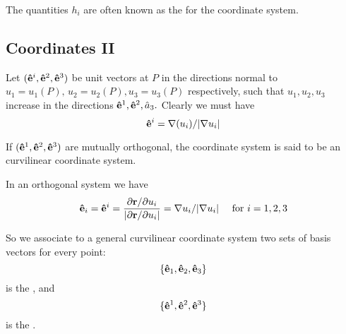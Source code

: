 The quantities 
$h_i$ are often known as the  for the coordinate system.\\

% 
% 


\subsection*{Coordinates II}


Let $(\mathbf{\hat e}^i,\mathbf{\hat e}^2,\mathbf{\hat e}^3)$ be unit vectors at $P$ in the directions normal to 
$u_1 = u_1(P),\,u_2 = u_2(P),u_3 = u_3(P)$
 respectively, such that $u_1, u_2, u_3$ increase in the directions $\mathbf{\hat e}^1, \mathbf{\hat e}^2,\hat  a_3.$ Clearly we must have
 \[
  \mathbf{\hat e}^i = \nabla(u_i)/|\nabla u_i|
\]

\begin{df}
 If $(\mathbf{\hat e}^1, \mathbf{\hat e}^2,\mathbf{\hat e}^3)$ are mutually orthogonal, the coordinate system is said to be an 
curvilinear coordinate system.
\end{df}

In an orthogonal system we have
\[
  \mathbf{\hat e}_i = \mathbf{\hat e}^i = \dfrac{\partial \mathbf r/\partial u_i}{|\partial \mathbf r/\partial u_i|}  = \nabla u_i / |\nabla u_i| \quad \mbox{ for $i=1,2,3$}
\]


So we associate to a  general curvilinear coordinate system  two sets of
basis vectors for every point:
\[\{\mathbf{\hat e}_1,\mathbf{\hat e}_2, \mathbf{\hat e}_3\}\]
is the
, and 
\[\{\mathbf{\hat e}^1,
\mathbf{\hat e}^2, \mathbf{\hat e}^3\} \]
is the
. 

